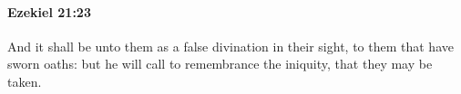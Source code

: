 
		\paragraph{Ezekiel 21:23} %
			\label{EZEKIEL-21-23}

			And it shall be unto them as a false divination in their sight, to them that have sworn oaths: but he will call to remembrance the iniquity, that they may be taken.


